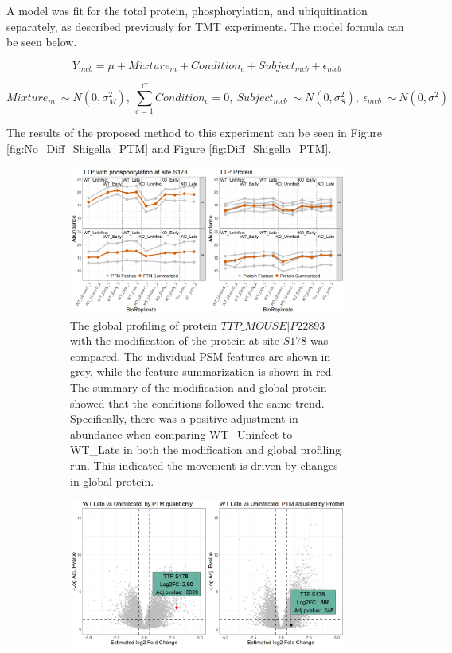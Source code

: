 \documentclass{mcp}
\begin{document}
A model was fit for the total protein, phosphorylation, and ubiquitination separately, as described previously for TMT experiments. The model formula can be seen below.

$$Y_{mcb} = \mu + Mixture_m + Condition_c + Subject_{mcb} + \epsilon_{mcb}$$

$$Mixture_m ~ \sim N(0, \sigma^2_M) ,\: \sum_{c=1}^C{Condition_c} = 0 ,\: Subject_{mcb} ~ \sim N(0, \sigma^2_S) ,\: \epsilon_{mcb} ~ \sim N(0, \sigma^2)$$

The results of the proposed method to this experiment can be seen in Figure \ref{fig:No_Diff_Shigella_PTM} and Figure \ref{fig:Diff_Shigella_PTM}.


\begin{figure}[h!]
\centering
 \begin{subfigure}{\textwidth}
 \centering
	\includegraphics[width=.95\textwidth]{sim_new/No_Difference_Shigella_Profile_Plot}
	\caption{The global profiling of protein $TTP\_MOUSE|P22893$ with the modification of the protein at site $S178$ was compared. The individual PSM features are shown in grey, while the feature summarization is shown in red. The summary of the modification and global protein showed that the conditions followed the same trend. Specifically, there was a positive adjustment in abundance when comparing WT\_Uninfect to WT\_Late in both the modification and global profiling run. This indicated the movement is driven by changes in global protein.}
 \end{subfigure}
 \begin{subfigure}{\textwidth}
 \centering
	\includegraphics[width=.9\textwidth]{sim_new/No_Difference_Shigella_Volcano}

\end{subfigure}
\end{figure}
\end{document}
